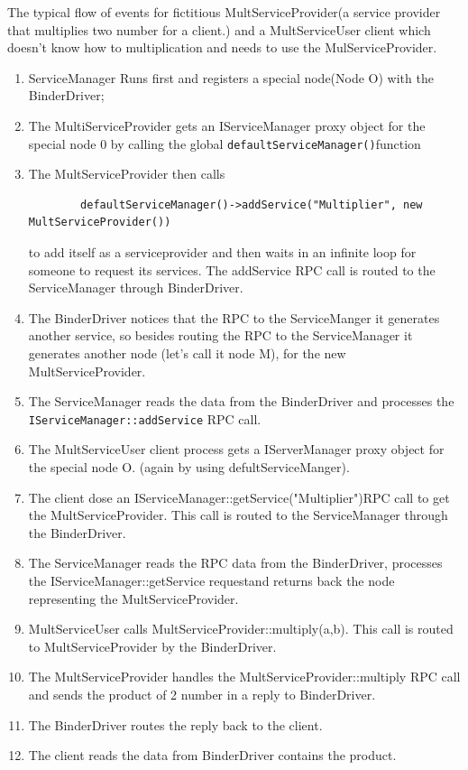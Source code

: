\documentclass[11pt, a4paper]{book}
\begin{document}
The typical flow of events for fictitious MultServiceProvider(a service provider
that multiplies two number for a client.) and a MultServiceUser client which
doesn't know how to multiplication and needs to use the MulServiceProvider.
\begin{enumerate}
    \item ServiceManager Runs first and registers a special node(Node O) with the 
        BinderDriver;
    \item The MultiServiceProvider gets an IServiceManager proxy object for the special node 0 by calling the global 
        \verb|defaultServiceManager()|function 
    \item The MultServiceProvider then calls
        \begin{verbatim}
        defaultServiceManager()->addService("Multiplier", new MultServiceProvider())
        \end{verbatim}
        to add itself as a serviceprovider and then
        waits in an infinite loop for someone to request its services. The
        addService RPC call is routed to the ServiceManager through 
        BinderDriver.
    \item The BinderDriver notices that the RPC to the ServiceManger it
    generates another service, so besides routing the RPC to the ServiceManager
    it generates another node (let's call it node M), for the new
    MultServiceProvider.
    \item The ServiceManager reads the data from the BinderDriver and processes
        the \verb|IServiceManager::addService| RPC call.
    \item The MultServiceUser client process gets a IServerManager proxy object
    for the special node O. (again by using defultServiceManger).
    \item The client dose an IServiceManager::getService("Multiplier")RPC call
    to get the MultServiceProvider. This call is routed to the ServiceManager
    through the BinderDriver.
    \item The ServiceManager reads the RPC data from the BinderDriver, processes
    the IServiceManager::getService requestand returns back the node
    representing the MultServiceProvider.
    \item MultServiceUser calls MultServiceProvider::multiply(a,b). This call is
    routed to MultServiceProvider by the BinderDriver.
    \item The MultServiceProvider handles the MultServiceProvider::multiply RPC
    call and sends the product of 2 number in a reply to BinderDriver.
    \item The BinderDriver routes the reply back to the client.
    \item The client reads the data from BinderDriver contains the product.
\end{enumerate}
\end{document}
